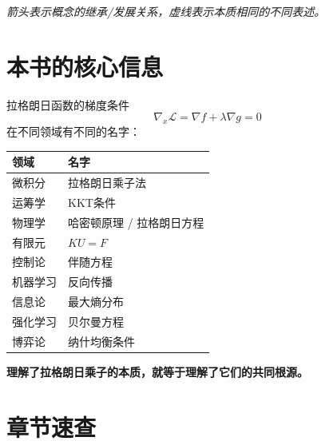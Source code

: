 \vspace{0.5cm}
\begin{center}
\textit{箭头表示概念的继承/发展关系，虚线表示本质相同的不同表述。}
\end{center}

\section*{本书的核心信息}

\begin{unification}[title=一个公式，多个化身]
拉格朗日函数的梯度条件
\[
\nabla_x \mathcal{L} = \nabla f + \lambda \nabla g = 0
\]
在不同领域有不同的名字：

\begin{center}
\renewcommand{\arraystretch}{1.4}
\begin{tabular}{l|l}
\toprule
\textbf{领域} & \textbf{名字} \\
\midrule
微积分 & 拉格朗日乘子法 \\
运筹学 & KKT条件 \\
物理学 & 哈密顿原理 / 拉格朗日方程 \\
有限元 & $KU=F$ \\
控制论 & 伴随方程 \\
机器学习 & 反向传播 \\
信息论 & 最大熵分布 \\
强化学习 & 贝尔曼方程 \\
博弈论 & 纳什均衡条件 \\
\bottomrule
\end{tabular}
\end{center}

\textbf{理解了拉格朗日乘子的本质，就等于理解了它们的共同根源。}
\end{unification}

\section*{章节速查}

